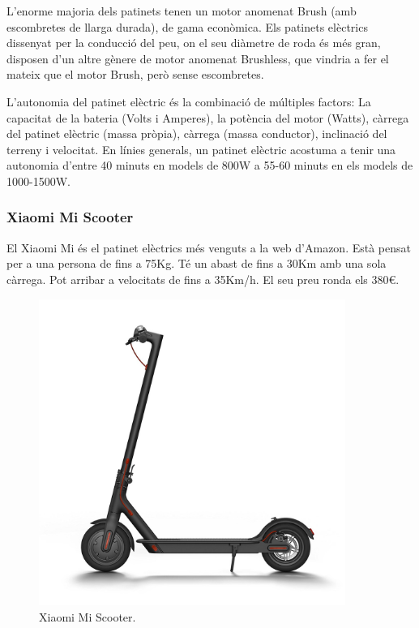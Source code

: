 L'enorme majoria dels patinets tenen un motor anomenat Brush (amb escombretes de llarga durada), de gama econòmica. Els patinets elèctrics dissenyat per la conducció del peu, on el seu diàmetre de roda és més gran, disposen d'un altre gènere de motor anomenat Brushless, que vindria a fer el mateix que el motor Brush, però sense escombretes. 

L'autonomia del patinet elèctric és la combinació de múltiples factors: La capacitat de la bateria (Volts i Amperes), la potència del motor (Watts), càrrega del patinet elèctric (massa pròpia), càrrega (massa conductor), inclinació del terreny i velocitat.
En línies generals, un patinet elèctric acostuma a tenir una autonomia d'entre 40 minuts en models de 800W a 55-60 minuts en els models de 1000-1500W.
\bigskip

\newpage 
\subsubsection{Xiaomi Mi Scooter}  
El Xiaomi Mi és el patinet elèctrics més venguts a la web d'Amazon. Està pensat per a una persona de fins a 75Kg. Té un abast de fins a 30Km amb una sola càrrega. Pot arribar a velocitats de fins a 35Km/h. El seu preu ronda els 380€. 
\begin{figure}[H]
		\centering
    	\includegraphics[width=10cm, height=10cm]{Marcteoric/patinetelectricxiamoi.jpg}
     	\caption{Xiaomi Mi Scooter.}
\end{figure}

